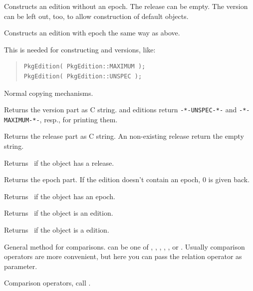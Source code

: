 \documentclass[10pt]{article}
\begin{document}
Constructs an edition without an epoch. The release  can be
empty. The version  can be left out, too, to allow construction
of default objects.

Constructs an edition with epoch the same way as above.

This is needed for constructing  and 
versions, like:
\begin{quote}
\begin{verbatim}
PkgEdition( PkgEdition::MAXIMUM );
PkgEdition( PkgEdition::UNSPEC );
\end{verbatim}
\end{quote}

Normal copying mechanisms.

Returns the version part as C string.  and 
editions return \verb|-*-UNSPEC-*-| and \verb|-*-MAXIMUM-*-|, resp.,
for printing them.

Returns the release part as C string. An non-existing release return
the empty string.

Returns \true\ if the object has a release.

Returns the epoch part. If the edition doesn't contain an epoch, 0 is
given back.

Returns \true\ if the object has an epoch.

Returns \true\ if the object is an  edition.

Returns \true\ if the object is a  edition.

General method for comparisons.  can be one of ,
, , , , or . Usually
comparison operators are more convenient, but here you can pass the
relation operator as parameter.

Comparison operators, call .
\end{document}
